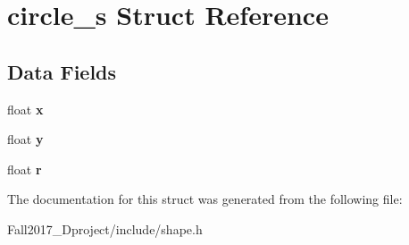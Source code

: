 \hypertarget{structcircle__s}{}\section{circle\+\_\+s Struct Reference}
\label{structcircle__s}
\subsection*{Data Fields}
\begin{DoxyCompactItemize}
\item 
\mbox{\label{structcircle__s_ad0da36b2558901e21e7a30f6c227a45e}} 
float {\bfseries x}
\item 
\mbox{\label{structcircle__s_aa4f0d3eebc3c443f9be81bf48561a217}} 
float {\bfseries y}
\item 
\mbox{\label{structcircle__s_a4788d82c901b9367dd5c0daff8a7616b}} 
float {\bfseries r}
\end{DoxyCompactItemize}


The documentation for this struct was generated from the following file\+:\begin{DoxyCompactItemize}
\item 
Fall2017\+\_\+Dproject/include/shape.\+h\end{DoxyCompactItemize}
